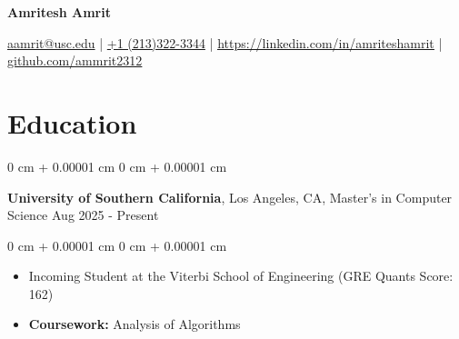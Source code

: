 \documentclass[10pt, a4paper]{article}
\newenvironment{highlights}{
    \begin{itemize}[
        topsep=0 cm,
        parsep=0 cm,
        partopsep=0pt,
        itemsep=0pt,
        leftmargin=0 cm + 10pt
    ]
}{
    \end{itemize}
} %
\newenvironment{onecolentry}{
    \begin{adjustwidth}{
        0 cm + 0.00001 cm
    }{
        0 cm + 0.00001 cm
    }
}{
    \end{adjustwidth}
} %
\newenvironment{twocolentry}[2][]{
    \onecolentry
    \def\secondColumn{#2}
    \setcolumnwidth{\fill, 6.0 cm}
    \begin{paracol}{2}
}{
    \switchcolumn \raggedleft \secondColumn
    \end{paracol}
    \endonecolentry
} %
\newenvironment{header}{
    \setlength{\topsep}{0pt}\par\kern\topsep\centering\linespread{1.0}
}{
    \par\kern\topsep
} %
\begin{document}
    \newcommand{\AND}{\unskip
        \cleaders\copy\ANDbox\hskip\wd\ANDbox
        \ignorespaces
    }
    \newsavebox\ANDbox
    \sbox\ANDbox{$|$}

    \begin{header}
    \fontsize{20 pt}{20 pt}\selectfont \textbf{Amritesh Amrit}

    \vspace{1pt} %



    \normalsize
    \href{mailto:aamrit@usc.edu}{aamrit@usc.edu} | \href{tel:+1(213)322-3344}{+1 (213)322-3344} | \href{https://linkedin.com/in/amriteshamrit}{\underline{https://linkedin.com/in/amriteshamrit}} | \href{https://github.com/ammrit2312}{\underline{github.com/ammrit2312}}


\end{header}

    \vspace{5 pt - 0.3 cm}

    \section{Education}
        \begin{twocolentry}{
            Aug 2025 - Present
        }
            \textbf{University of Southern California}, Los Angeles, CA, Master's in Computer Science\end{twocolentry}

        \vspace{0.10 cm}
        \begin{onecolentry}
            \begin{highlights}
                \item Incoming Student at the Viterbi School of Engineering (GRE Quants Score: 162)
                \item \textbf{Coursework:} Analysis of Algorithms
            \end{highlights}
        \end{onecolentry}
\end{document}
